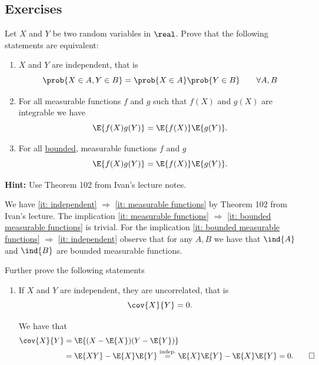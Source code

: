 \subsection*{Exercises}

\begin{exercise}
   Let \(X\) and \(Y\) be two random variables in \(\real\). Prove that
   the following statements are equivalent:
   \begin{enumerate}[label=(\roman*),noitemsep]
        \item\label{it: independent} \(X\) and \(Y\) are independent, that is
        \[
            \prob{X \in A, Y \in B} = \prob{X \in A}\prob{Y \in B} \qquad \forall A, B
        \]
        \item\label{it: measurable functions} For all measurable functions \(f\) and \(g\) such that \(f(X)\)
        and \(g(X)\) are integrable we have
        \[
            \E{f(X)g(Y)} = \E{f(X)}\E{g(Y)}.
        \]
        \item\label{it: bounded measurable functions} For all \underline{bounded}, measurable functions \(f\) and \(g\)
        \[
            \E{f(X)g(Y)} = \E{f(X)}\E{g(Y)}.
        \]
   \end{enumerate}
   \textbf{Hint: } Use Theorem 102 from Ivan's lecture notes.
   \begin{solution}
        We have \ref{it: independent} \(\Rightarrow\) \ref{it: measurable functions} by Theorem 102 from Ivan's lecture.
        The implication \ref{it: measurable functions} \(\Rightarrow\) \ref{it: bounded measurable functions} is trivial.
        For the implication \ref{it: bounded measurable functions} \(\Rightarrow\) \ref{it: independent} observe that for any \(A, B\) we have
        that \(\ind{A}\) and \(\ind{B}\) are bounded measurable functions.
   \end{solution}
    
   \noindent Further prove the following statements
    \begin{enumerate}[label=(\alph*),noitemsep]
        \item If \(X\) and \(Y\) are independent, they are uncorrelated, that is
        \[
            \cov{X}{Y} = 0.
        \]
        \begin{solution}
            We have that
            \begin{align*}
                \cov{X}{Y}
                &= \E{(X-\E{X})(Y-\E{Y})}
                \\
                &= \E{XY} - \E{X}\E{Y}
                \overset{\text{indep.}}=
                \E{X}\E{Y} - \E{X}\E{Y} = 0.
                \qedhere
            \end{align*}
        \end{solution}


\end{enumerate}
\end{exercise}
